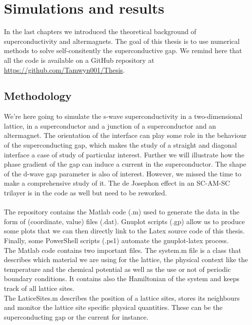 \documentclass[../main.tex]{subfile}
\begin{document}
\section{Simulations and results}
In the last chapters we introduced the theoretical background of superconductivity and altermagnets. 
The goal of this thesis is to use numerical methods to solve self-consitently the superconductive gap.
We remind here that all the code is available on a GitHub repository at \url{https://github.com/Tamwyn001/Thesis}.\\

\subsection{Methodology}
We're here going to simulate the s-wave superconductivity in a two-dimensional lattice,
in a superconductor and a junction of a superconductor and an altermagnet. 
The orientation of the interface can play some role in the behaviour of the superconducting gap, which 
makes the study of a straight and diagonal interface a case of study of particular interest. 
Further we will illustrate how the phase gradient of the gap can induce a current in the superconductor.
The shape of the d-wave gap parameter is also of interest. However, we missed the time to make a comprehensive study of it.
The de Josephon effect in an SC-AM-SC trilayer is in the code as well but need to be reworked.\\
\\    

The repository contains the Matlab code (.m) used to generate the data in the form of (coordinate, value) files (.dat).
Gnuplot scripts (.gp) allow us to produce some plots that we can then directly link to the Latex source code
of this thesis. Finally, some PowerShell scripts (.ps1) automate the gnuplot-latex process.\\

The Matlab code contains two important files. The system.m file is a class that describes which
 material we are using for the lattice, the physical context like the temperature and the chemical potential
as well as the use or not of periodic boundary conditions. It contains also the Hamiltonian of the system
and keeps track of all lattice sites.\\
The LaticeSites.m describes the position of a lattice sites, stores its neighbours and monitor the lattice
site specific physical quantities. These can be the superconducting gap or the current for instance.\\
\end{document}
